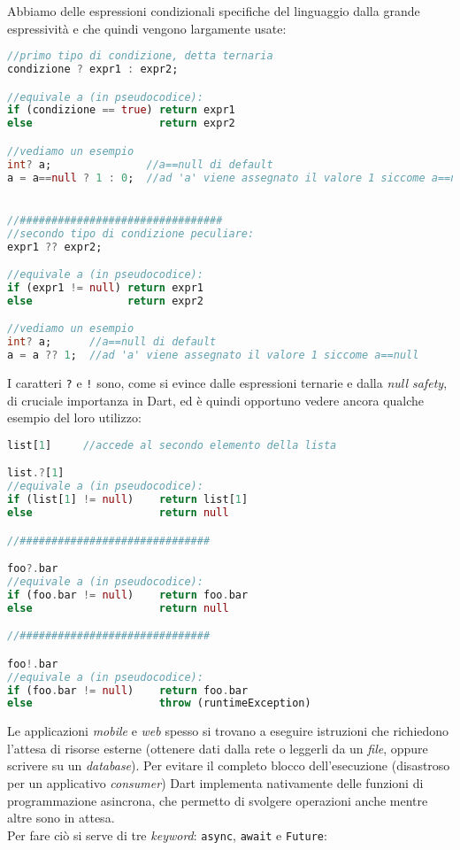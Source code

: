 Abbiamo delle espressioni condizionali specifiche del linguaggio dalla grande espressività e che quindi vengono largamente usate:

\begin{lstlisting}[language=dart, firstnumber=1,caption={Dart espressioni ternarie}]
//primo tipo di condizione, detta ternaria
condizione ? expr1 : expr2;

//equivale a (in pseudocodice):
if (condizione == true) return expr1
else                    return expr2

//vediamo un esempio
int? a;               //a==null di default
a = a==null ? 1 : 0;  //ad 'a' viene assegnato il valore 1 siccome a==null


//################################
//secondo tipo di condizione peculiare:
expr1 ?? expr2;

//equivale a (in pseudocodice):
if (expr1 != null) return expr1
else               return expr2

//vediamo un esempio
int? a;      //a==null di default
a = a ?? 1;  //ad 'a' viene assegnato il valore 1 siccome a==null
\end{lstlisting}

I caratteri \verb+?+ e \verb+!+ sono, come si evince dalle espressioni ternarie e dalla \textit{null safety}, di cruciale importanza in Dart, ed è quindi opportuno vedere ancora qualche esempio del loro utilizzo:

\begin{lstlisting}[language=dart, firstnumber=1,caption={Dart operatori '?' e '!'}]
list[1]     //accede al secondo elemento della lista

list.?[1]
//equivale a (in pseudocodice):
if (list[1] != null)    return list[1]
else                    return null

//##############################

foo?.bar 
//equivale a (in pseudocodice):
if (foo.bar != null)    return foo.bar
else                    return null

//##############################

foo!.bar
//equivale a (in pseudocodice):
if (foo.bar != null)    return foo.bar
else                    throw (runtimeException)
\end{lstlisting}

Le applicazioni \textit{mobile} e \textit{web} spesso si trovano a eseguire istruzioni che richiedono l'attesa di risorse esterne (ottenere dati dalla rete o leggerli da un \textit{file}, oppure scrivere su un \textit{database}). Per evitare il completo blocco dell'esecuzione (disastroso per un applicativo \textit{consumer}) Dart implementa nativamente delle funzioni di programmazione asincrona, che permetto di svolgere operazioni anche mentre altre sono in attesa.\\
Per fare ciò si serve di tre \textit{keyword}: \verb+async+, \verb+await+ e \verb+Future+:

